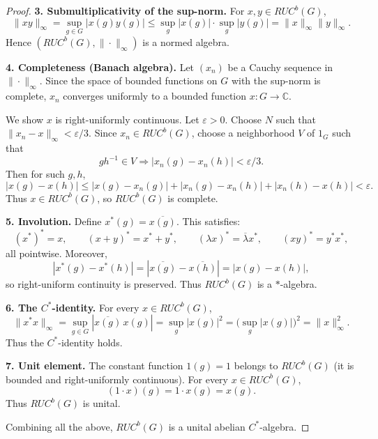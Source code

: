 \begin{mynote}
\begin{proof}
        \medskip
        \noindent\textbf{3. Submultiplicativity of the sup-norm.}
        For $x,y\in RUC^b(G)$,
        \[
            \|xy\|_\infty
            =\sup_{g\in G}|x(g)y(g)|
            \le \sup_{g}|x(g)|\cdot\sup_{g}|y(g)|
            =\|x\|_\infty\|y\|_\infty.
        \]
        Hence $(RUC^b(G),\|\cdot\|_\infty)$ is a normed algebra.

        \medskip
        \noindent\textbf{4. Completeness (Banach algebra).}
        Let $(x_n)$ be a Cauchy sequence in $\|\cdot\|_\infty$.
        Since the space of bounded functions on $G$ with the sup-norm is complete,
        $x_n$ converges uniformly to a bounded function $x:G\to\mathbb C$.

        We show $x$ is right-uniformly continuous.
        Let $\varepsilon>0$.  Choose $N$ such that $\|x_n-x\|_\infty<\varepsilon/3$.
        Since $x_n\in RUC^b(G)$, choose a neighborhood $V$ of $1_G$ such that
        \[
            gh^{-1}\in V \Rightarrow |x_n(g)-x_n(h)|<\varepsilon/3.
        \]
        Then for such $g,h$,
        \[
            |x(g)-x(h)|
            \le |x(g)-x_n(g)| + |x_n(g)-x_n(h)| + |x_n(h)-x(h)|
            < \varepsilon.
        \]
        Thus $x\in RUC^b(G)$, so $RUC^b(G)$ is complete.

        \medskip
        \noindent\textbf{5. Involution.}
        Define $x^*(g)=\overline{x(g)}$.  This satisfies:
        \[
            (x^*)^*=x,\qquad (x+y)^*=x^*+y^*,\qquad (\lambda x)^*=\overline{\lambda}x^*,\qquad
            (xy)^*=y^*x^*,
        \]
        all pointwise.  Moreover,
        \[
            |x^*(g)-x^*(h)| = |\overline{x(g)}-\overline{x(h)}| = |x(g)-x(h)|,
        \]
        so right-uniform continuity is preserved.
        Thus $RUC^b(G)$ is a $*$-algebra.

        \medskip
        \noindent\textbf{6. The $C^*$-identity.}
        For every $x\in RUC^b(G)$,
        \[
            \|x^*x\|_\infty
            =\sup_{g\in G}|\overline{x(g)}\,x(g)|
            =\sup_{g}|x(g)|^2
            =\bigl(\sup_{g}|x(g)|\bigr)^2
            =\|x\|_\infty^2.
        \]
        Thus the $C^*$-identity holds.

        \medskip
        \noindent\textbf{7. Unit element.}
        The constant function $1(g)=1$ belongs to $RUC^b(G)$ (it is bounded and
        right-uniformly continuous).  For every $x\in RUC^b(G)$,
        \[
            (1\cdot x)(g)=1\cdot x(g)=x(g).
        \]
        Thus $RUC^b(G)$ is unital.

        \medskip
        Combining all the above, $RUC^b(G)$ is a unital abelian $C^*$-algebra.
    \end{proof}

\end{mynote}

